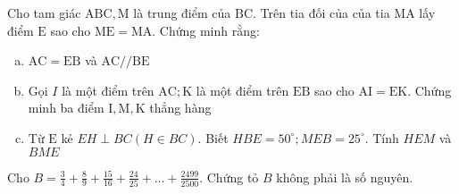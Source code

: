 \begin{bt}
    Cho tam giác $\mathrm{ABC}, \mathrm{M}$ là trung điểm của $\mathrm{BC}$. Trên tia đối của của tia $\mathrm{MA}$ lấy điểm $\mathrm{E}$ sao cho $\mathrm{ME}=\mathrm{MA}$. Chứng minh rằng:
    \begin{enumerate}[a.]
        \item $\mathrm{AC}=\mathrm{EB}$ và $\mathrm{AC} / / \mathrm{BE}$
        \item Gọi $I$ là một điểm trên $\mathrm{AC} ; \mathrm{K}$ là một điểm trên $\mathrm{EB}$ sao cho $\mathrm{AI}=\mathrm{EK}$. Chứng minh ba điểm $\mathrm{I}, \mathrm{M}, \mathrm{K}$ thẳng hàng
        \item Từ $\mathrm{E}$ kẻ $E H \perp B C(H \in B C)$. Biết $HBE=50^{\circ} ; MEB=25^{\circ}$.
        Tính $HEM$ và $BME$
    \end{enumerate}
\loigiai{}
\end{bt}

\begin{bt}
    Cho $B=\frac{3}{4}+\frac{8}{9}+\frac{15}{16}+\frac{24}{25}+\ldots+\frac{2499}{2500}$. Chứng tỏ $B$ không phải là số nguyên.
\loigiai{}
\end{bt}

